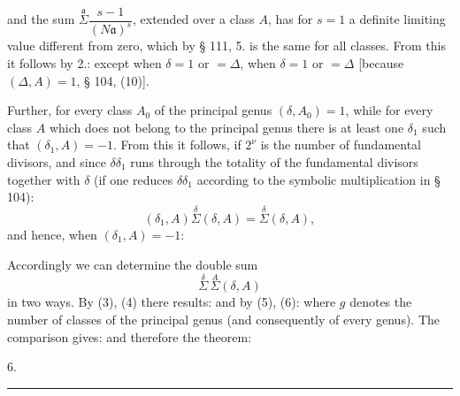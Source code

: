 and the sum $\overset{\mathfrak a}{\Sigma}\dfrac{s-1}{(N\mathfrak a)^s}$, extended over a class $A$, has for $s=1$ a definite limiting value different from zero, which by § 111, 5. is the same for all classes. From this it follows by 2.:
except when $\delta=1$ or $=\Delta$,
when $\delta=1$ or $=\Delta$ [because $(\Delta,A)=1$, § 104, (10)].

Further, for every class $A_0$ of the principal genus $(\delta,A_0)=1$, while for every class $A$ which does not belong to the principal genus there is at least one $\delta_1$ such that $(\delta_1,A)=-1$. From this it follows, if $2^\nu$ is the number of fundamental divisors,
and since $\delta\delta_1$ runs through the totality of the fundamental divisors together with $\delta$ (if one reduces $\delta\delta_1$ according to the symbolic multiplication in § 104):
\[
(\delta_1,A)\overset{\delta}{\Sigma}(\delta,A) = \overset{\delta}{\Sigma}(\delta,A),
\]
and hence, when $(\delta_1,A)=-1$:

Accordingly we can determine the double sum
\[
\overset{\delta}{\Sigma}\,\overset{A}{\Sigma}(\delta,A)
\]
in two ways. By (3), (4) there results:
and by (5), (6):
where $g$ denotes the number of classes of the principal genus (and consequently of every genus). The comparison gives:
and therefore the theorem:

6. 

\begin{center}\rule{0.32\linewidth}{0.4pt}\end{center}
